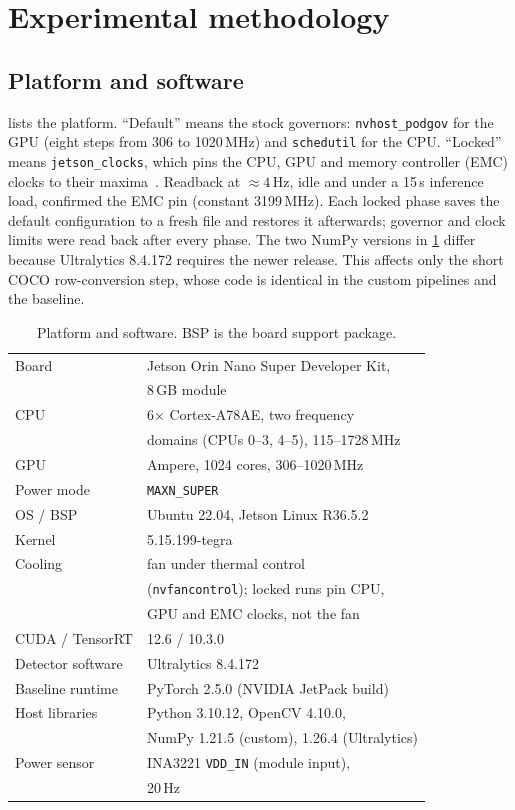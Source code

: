 \section{Experimental methodology}
\label{sec:setup}

\subsection{Platform and software}

 lists the platform. ``Default'' means the stock
governors: \texttt{nvhost\_podgov} for the GPU (eight
steps from 306 to 1020\,MHz) and \texttt{schedutil} for the CPU.
``Locked'' means \texttt{jetson\_clocks}, which pins the CPU, GPU and
memory controller (EMC) clocks to their
maxima~\cite{nvidia2024jetsonperf}. Readback at ${\approx}4$\,Hz, idle
and under a 15\,s inference load, confirmed the EMC pin (constant
3199\,MHz). Each locked phase
saves the default configuration to a fresh file and restores it
afterwards; governor and clock limits were read back after every phase. The two NumPy versions in \cref{tab:platform} differ
because Ultralytics 8.4.172 requires the newer release. This affects
only the short COCO row-conversion step, whose code is identical in
the custom pipelines and the baseline.

\begin{table}[t]
\centering
\caption{Platform and software. BSP is the board support package.}
\label{tab:platform}
\footnotesize
\begin{tabular}{@{}ll@{}}
\toprule
Board & Jetson Orin Nano Super Developer Kit, \\ & 8\,GB module \\
CPU & 6$\times$ Cortex-A78AE, two frequency \\
    & domains (CPUs 0--3, 4--5), 115--1728\,MHz \\
GPU & Ampere, 1024 cores, 306--1020\,MHz \\
Power mode & \texttt{MAXN\_SUPER} \\
OS / BSP & Ubuntu 22.04, Jetson Linux R36.5.2 \\
Kernel & 5.15.199-tegra \\
Cooling & fan under thermal control \\
 & (\texttt{nvfancontrol}); locked runs pin CPU, \\
 & GPU and EMC clocks, not the fan \\
CUDA / TensorRT & 12.6 / 10.3.0 \\
Detector software & Ultralytics 8.4.172 \\
Baseline runtime & PyTorch 2.5.0 (NVIDIA JetPack build) \\
Host libraries & Python 3.10.12, OpenCV 4.10.0, \\ & NumPy 1.21.5 (custom), 1.26.4 (Ultralytics) \\
Power sensor & INA3221 \texttt{VDD\_IN} (module input), \\ & 20\,Hz \\
\bottomrule
\end{tabular}
\end{table}

